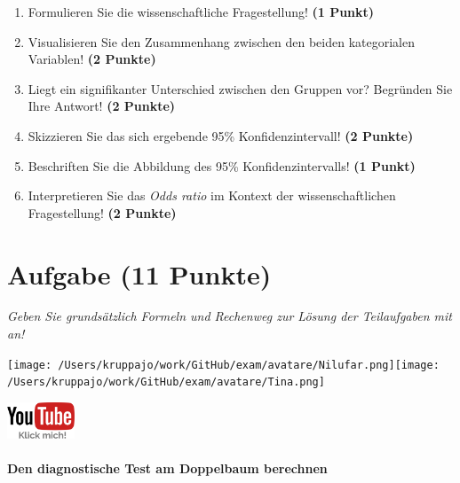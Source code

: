 \documentclass[a4paper, 9pt]{scrartcl}\usepackage[]{graphicx}\usepackage[]{xcolor}
\begin{document}
\begin{enumerate}
\item Formulieren Sie die wissenschaftliche Fragestellung! \textbf{(1 Punkt)}
\item Visualisieren Sie den Zusammenhang zwischen den beiden kategorialen Variablen! \textbf{(2 Punkte)}
\item Liegt ein signifikanter Unterschied zwischen den Gruppen vor? Begründen Sie Ihre Antwort! \textbf{(2 Punkte)}
\item Skizzieren Sie das sich ergebende 95\% Konfidenzintervall! \textbf{(2 Punkte)}
\item Beschriften Sie die Abbildung des 95\% Konfidenzintervalls! \textbf{(1 Punkt)} 
\item Interpretieren Sie das \textit{Odds ratio} im Kontext der wissenschaftlichen Fragestellung! \textbf{(2 Punkte)} 
\end{enumerate}
 
\clearpage

\section{Aufgabe \hfill (11 Punkte)}

\textit{Geben Sie grundsätzlich Formeln und Rechenweg zur Lösung der Teilaufgaben mit an!} \\[1Ex]
 

 
\begin{minipage}[t]{0.5\textwidth}
\texttt{[image: /Users/kruppajo/work/GitHub/exam/avatare/Nilufar.png]}\hspace{-4mm}\texttt{[image: /Users/kruppajo/work/GitHub/exam/avatare/Tina.png]}
\end{minipage}
\begin{minipage}[t]{0.5\textwidth}
\hfill
\href{https://youtu.be/VQlNl8hvRII}{\includegraphics[width = 2cm]{img/youtube}}
\end{minipage}



\paragraph{Den diagnostische Test am Doppelbaum berechnen}
\end{document}
